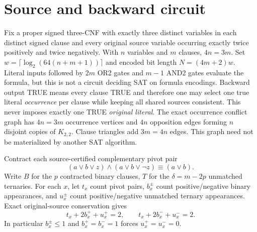 \documentclass[11pt]{article}
\begin{document}
\section{Source and backward circuit}
Fix a proper signed three-CNF with exactly three distinct variables in each distinct signed clause and every original source variable occurring exactly twice positively and twice negatively. With $n$ variables and $m$ clauses, $4n=3m$. Set $w=\lceil\log_2(64(n+m+1))\rceil$ and encoded bit length $N=(4m+2)w$. Literal inputs followed by $2m$ OR2 gates and $m-1$ AND2 gates evaluate the formula, but this is not a circuit deciding SAT on formula encodings. Backward output TRUE means every clause TRUE and therefore one may select one true literal \emph{occurrence} per clause while keeping all shared sources consistent. This never imposes exactly one TRUE \emph{original literal}. The exact occurrence conflict graph has $4n=3m$ occurrence vertices and $4n$ opposition edges forming $n$ disjoint copies of $K_{2,2}$. Clause triangles add $3m=4n$ edges. This graph need not be materialized by another SAT algorithm.

Contract each source-certified complementary pivot pair
\[
(a\lor b\lor z)\land(a\lor b\lor\neg z)\equiv(a\lor b).
\]
Write $B$ for the $p$ contracted binary clauses, $T$ for the $\delta=m-2p$ unmatched ternaries. For each $x$, let $t_x$ count pivot pairs, $b_x^\pm$ count positive/negative binary appearances, and $u_x^\pm$ count positive/negative unmatched ternary appearances. Exact original-source conservation gives
\begin{equation}\label{eq:conservation}
t_x+2b_x^++u_x^+=2,\qquad t_x+2b_x^-+u_x^-=2.
\end{equation}
In particular $b_x^\pm\le1$ and $b_x^+=b_x^-=1$ forces $u_x^+=u_x^-=0$.
\end{document}
